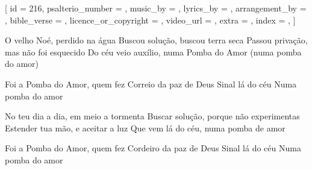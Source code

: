 [
    id                     = {216},
    psalterio_number       = {},
    music_by               = {},
    lyrics_by              = {},
    arrangement_by         = {},
    bible_verse            = {},
    licence_or_copyright   = {},
    video_url              = {},
    extra                  = {},
    index                  = {},
]


\beginverse

O velho Noé, perdido na água
Buscou solução, buscou terra seca
Passou privação, mas não foi esquecido
Do céu veio auxílio, numa Pomba do Amor (numa pomba do amor)

\endverse


\beginchorus

Foi a Pomba do Amor, quem fez
Correio da paz de Deus
Sinal lá do céu
Numa pomba do amor

\endchorus


\beginverse

No teu dia a dia, em meio a tormenta
Buscar solução, porque não experimentas
Estender tua mão, e aceitar a luz
Que vem lá do céu, numa pomba de amor

\endverse


\beginchorus

Foi a Pomba do Amor, quem fez
Cordeiro da paz de Deus
Sinal lá do céu
Numa pomba do amor

\endchorus

\endsong
